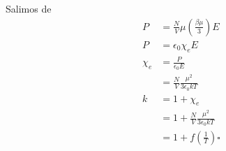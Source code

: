 \documentclass{report}
\begin{document}
\section{}

Salimos de
\begin{align*}
	P &= \frac{N}{V} \mu \left( \frac{\beta \mu}{3} \right) E\\
	P &= \epsilon_0 \chi_e E\\
	\chi_e &= \frac{P}{\epsilon_0 E}\\
	&= \frac{N}{V} \frac{\mu^2}{3\epsilon_0 kT}\\
	k &= 1 + \chi_e\\
	&= 1 + \frac{N}{V} \frac{\mu^2}{3\epsilon_0 kT}\\
	&= 1 + f \left( \frac{1}{T} \right)\square
\end{align*}
\end{document}
